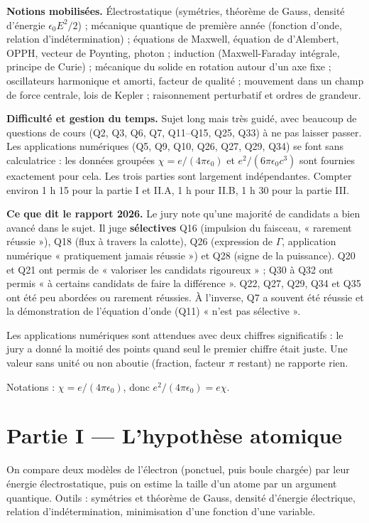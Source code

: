\documentclass[11pt,a4paper]{article}
\begin{document}
\textbf{Notions mobilisées.} Électrostatique (symétries, théorème de Gauss, densité d'énergie \(\epsilon_0E^2/2\)) ; mécanique quantique de première année (fonction d'onde, relation d'indétermination) ; équations de Maxwell, équation de d'Alembert, OPPH, vecteur de Poynting, photon ; induction (Maxwell-Faraday intégrale, principe de Curie) ; mécanique du solide en rotation autour d'un axe fixe ; oscillateurs harmonique et amorti, facteur de qualité ; mouvement dans un champ de force centrale, lois de Kepler ; raisonnement perturbatif et ordres de grandeur.

\textbf{Difficulté et gestion du temps.} Sujet long mais très guidé, avec beaucoup de questions de cours (Q2, Q3, Q6, Q7, Q11--Q15, Q25, Q33) à ne pas laisser passer. Les applications numériques (Q5, Q9, Q10, Q26, Q27, Q29, Q34) se font sans calculatrice : les données groupées \(\chi=e/(4\pi\epsilon_0)\) et \(e^2/(6\pi\epsilon_0c^3)\) sont fournies exactement pour cela. Les trois parties sont largement indépendantes. Compter environ 1 h 15 pour la partie I et II.A, 1 h pour II.B, 1 h 30 pour la partie III.

\textbf{Ce que dit le rapport 2026.} Le jury note qu'une majorité de candidats a bien avancé dans le sujet. Il juge \textbf{sélectives} Q16 (impulsion du faisceau, « rarement réussie »), Q18 (flux à travers la calotte), Q26 (expression de \(\Gamma\), application numérique « pratiquement jamais réussie ») et Q28 (signe de la puissance). Q20 et Q21 ont permis de « valoriser les candidats rigoureux » ; Q30 à Q32 ont permis « à certains candidats de faire la différence ». Q22, Q27, Q29, Q34 et Q35 ont été peu abordées ou rarement réussies. À l'inverse, Q7 a souvent été réussie et la démonstration de l'équation d'onde (Q11) « n'est pas sélective ».

Les applications numériques sont attendues avec deux chiffres significatifs : le jury a donné la moitié des points quand seul le premier chiffre était juste. Une valeur sans unité ou non aboutie (fraction, facteur \(\pi\) restant) ne rapporte rien.

Notations : \(\chi=e/(4\pi\epsilon_0)\), donc \(e^2/(4\pi\epsilon_0)=e\chi\).

\hypertarget{partie-i-lhypothuxe8se-atomique}{%
\section{Partie I --- L'hypothèse atomique}\label{partie-i-lhypothuxe8se-atomique}}

On compare deux modèles de l'électron (ponctuel, puis boule chargée) par leur énergie électrostatique, puis on estime la taille d'un atome par un argument quantique. Outils : symétries et théorème de Gauss, densité d'énergie électrique, relation d'indétermination, minimisation d'une fonction d'une variable.
\end{document}
